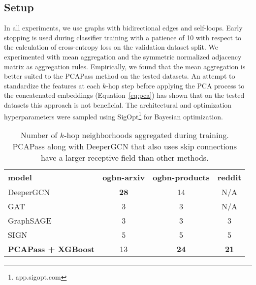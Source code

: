 \documentclass[nohyperref]{article}
\theoremstyle{plain}
\theoremstyle{definition}
\theoremstyle{remark}
\begin{document}
\subsection{Setup}
In all experiments, we use graphs with bidirectional edges and self-loops. Early stopping is used during classifier training with a patience of 10 with respect to the calculation of cross-entropy loss on the validation dataset split. We experimented with mean aggregation and the symmetric normalized adjacency matrix as aggregation rules. Empirically, we found that the mean aggregation is better suited to the PCAPass method on the tested datasets. An attempt to standardize the features at each $k$-hop step before applying the PCA process to the concatenated embeddings (Equation~\ref{eq:pca}) has shown that on the tested datasets this approach is not beneficial. The architectural and optimization hyperparameters were sampled using SigOpt\footnote{app.sigopt.com} for Bayesian optimization.

\begin{table}[H]
        \centering
        \caption{Number of $k$-hop neighborhoods aggregated during training. 
        PCAPass along with DeeperGCN that also uses skip connections have a larger receptive field than other methods.}
        \label{khop-table}
\vskip 0.15in
        \begin{center}
        \begin{small}
        \begin{sc}
        \fontsize{6.5}{7}\selectfont
        \begin{tabular}{lccc}
        \toprule
        \textbf{model} & \textbf{ogbn-arxiv} & \phantom{1} \textbf{ogbn-products} & \phantom{1} \textbf{reddit} \\
        \midrule
        DeeperGCN&\phantom{1}\textbf{28}&\phantom{1}14&  \phantom{1}N/A\\
        GAT&\phantom{1}3&\phantom{1}3&\phantom{1}N/A\\
        GraphSAGE&\phantom{1}3&\phantom{1}3&\phantom{1}3\\
        SIGN&\phantom{1}5&\phantom{1}5&\phantom{1}5\\
        \textbf{PCAPass + XGBoost}&\phantom{1}13&\phantom{1}\textbf{24}&\phantom{1}\textbf{21}\\
        \bottomrule
        \end{tabular}
        \end{sc}
        \end{small}
        \end{center}
        \vskip -0.1in
        \end{table}
\end{document}
